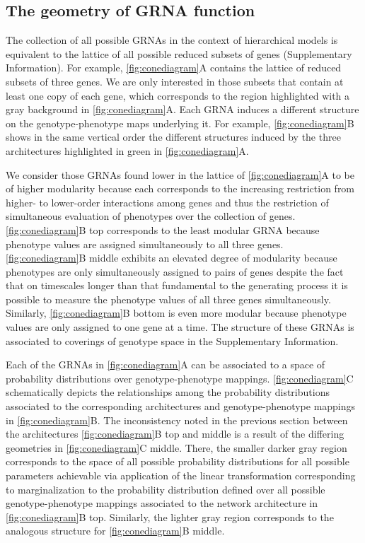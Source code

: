 \subsection{The geometry of GRNA function}
The collection of all possible GRNAs in the context of hierarchical models is equivalent to the lattice of all possible reduced subsets of genes (Supplementary Information). For example, \ref{fig:conediagram}A contains the lattice of reduced subsets of three genes. We are only interested in those subsets that contain at least one copy of each gene, which corresponds to the region highlighted with a gray background in \ref{fig:conediagram}A. Each GRNA induces a different structure on the genotype-phenotype maps underlying it. For example, \ref{fig:conediagram}B shows in the same vertical order the different structures induced by the three architectures highlighted in green in \ref{fig:conediagram}A.

We consider those GRNAs found lower in the lattice of \ref{fig:conediagram}A to be of higher modularity because each corresponds to the increasing restriction from higher- to lower-order interactions among genes and thus the restriction of simultaneous evaluation of phenotypes over the collection of genes. \ref{fig:conediagram}B top corresponds to the least modular GRNA because phenotype values are assigned simultaneously to all three genes. \ref{fig:conediagram}B middle exhibits an elevated degree of modularity because phenotypes are only simultaneously assigned to pairs of genes despite the fact that on timescales longer than that fundamental to the generating process it is possible to measure the phenotype values of all three genes simultaneously. Similarly, \ref{fig:conediagram}B bottom is even more modular because phenotype values are only assigned to one gene at a time. The structure of these GRNAs is associated to coverings of genotype space in the Supplementary Information.

Each of the GRNAs in \ref{fig:conediagram}A can be associated to a space of probability distributions over genotype-phenotype mappings. \ref{fig:conediagram}C schematically depicts the relationships among the probability distributions associated to the corresponding architectures and genotype-phenotype mappings in \ref{fig:conediagram}B. The inconsistency noted in the previous section between the architectures \ref{fig:conediagram}B top and middle is a result of the differing geometries in \ref{fig:conediagram}C middle. There, the smaller darker gray region corresponds to the space of all possible probability distributions for all possible parameters achievable via application of the linear transformation corresponding to marginalization to the probability distribution defined over all possible genotype-phenotype mappings associated to the network architecture in \ref{fig:conediagram}B top. Similarly, the lighter gray region corresponds to the analogous structure for \ref{fig:conediagram}B middle.

